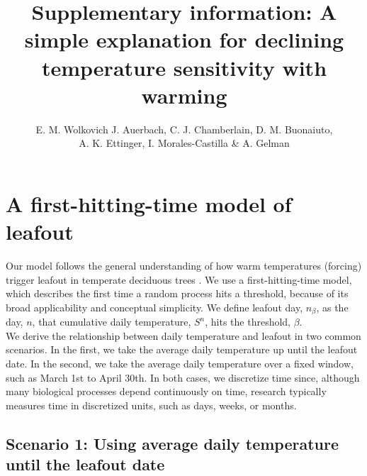 \documentclass[11pt]{article}
\begin{document}
\renewcommand{\refname}{\CHead{}}

\title{Supplementary information: A simple explanation for declining temperature sensitivity with warming} 

\author{E. M. Wolkovich  J. Auerbach, C. J. Chamberlain, D. M. Buonaiuto, \\ A. K. Ettinger, I. Morales-Castilla \& A. Gelman}
\date{} 
\maketitle  
\renewcommand{\thetable}{S\arabic{table}}
\renewcommand{\thefigure}{S\arabic{figure}}


\section{A first-hitting-time model of leafout}

Our model follows the general understanding of how warm temperatures (forcing) trigger leafout in temperate deciduous trees \citep{chuineJTB}. We use a first-hitting-time model, which describes the first time a random process hits a threshold, because of its broad applicability and conceptual simplicity. We define leafout day, $n_\beta$, as the day, $n$, that cumulative daily temperature, $S^n$, hits the threshold, $\beta$. \\ 

We derive the relationship between daily temperature and leafout in two common scenarios. In the first, we take the average daily temperature up until the leafout date. In the second, we take the average daily temperature over a fixed window, such as March 1st to April 30th. In both cases, we discretize time since, although many biological processes depend continuously on time, research typically measures time in discretized units, such as days, weeks, or months. %

\subsection{Scenario 1: Using average daily temperature until the leafout date}
\end{document}
